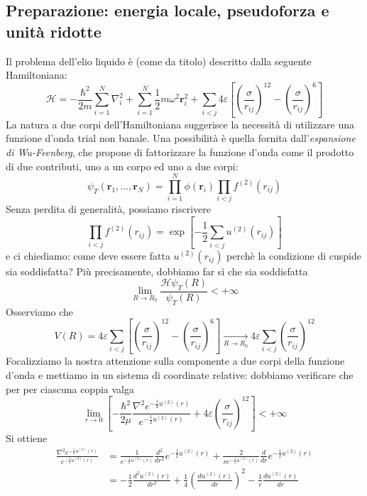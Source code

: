 \documentclass[11pt,a4paper]{article}
\begin{document}
\subsection{Preparazione: energia locale, pseudoforza e unità ridotte}
Il problema dell'elio liquido è (come da titolo) descritto dalla seguente Hamiltoniana:
\begin{equation}
\mathcal{H} = -\frac{\hbar^2}{2m}\sum_{i=1}^N \nabla_i^2 + \sum_{i=1}^N\frac{1}{2}m\omega^2\textbf{r}_i^2 + \sum_{i<j}4\varepsilon \left[ \left(\frac{\sigma}{r_{ij}}\right)^{12}- \left(\frac{\sigma}{r_{ij}}\right)^6 \right]
\end{equation}
La natura a due corpi dell'Hamiltoniana suggerisce la necessità di utilizzare una funzione d'onda trial non banale. Una possibilità è quella fornita dall'\emph{espansione di Wu-Feenberg}, che propone di fattorizzare la funzione d'onda come il prodotto di due contributi, uno a un corpo ed uno a due corpi:
\begin{equation}
\psi_T(\textbf{r}_1,\ldots,\textbf{r}_N) = \prod_{i=1}^N \phi(\textbf{r}_i)\prod_{i<j}f^{(2)}(r_{ij})
\end{equation}
Senza perdita di generalità, possiamo riscrivere
\[
\prod_{i<j}f^{(2)}(r_{ij}) = \exp\left[ -\frac{1}{2}\sum_{i<j}u^{(2)}(r_{ij})\right]
\]
e ci chiediamo: come deve essere fatta $u^{(2)}(r_{ij})$ perchè la condizione di cuspide sia soddisfatta? Più precisamente, dobbiamo far sì che sia soddisfatta
\begin{equation}
\lim_{R\to R_0}\frac{\mathcal{H}\psi_T(R)}{\psi_T(R)}< +\infty
\end{equation}
Osserviamo che
\[
V(R) = 4\varepsilon \sum_{i<j}\left[ \left(\frac{\sigma}{r_{ij}}\right)^{12}- \left(\frac{\sigma}{r_{ij}}\right)^6 \right] \xrightarrow[R \to R_0]{} 4\varepsilon \sum_{i<j}\left(\frac{\sigma}{r_{ij}}\right)^{12}
\]
Focalizziamo la nostra attenzione sulla componente a due corpi della funzione d'onda e mettiamo in un sistema di coordinate relative: dobbiamo verificare che per per ciascuna coppia valga
\[
\lim_{r \to 0} \left[ -\frac{\hbar^2}{2\mu}\frac{\nabla^2 e^{-\frac{1}{2}u^{(2)}(r)}}{e^{-\frac{1}{2}u^{(2)}(r)}} +  4\varepsilon\left(\frac{\sigma}{r_{ij}}\right)^{12}\right] < +\infty
\]
Si ottiene
\[
\begin{split}
\frac{\nabla^2 e^{-\frac{1}{2}u^{(2)}(r)}}{e^{-\frac{1}{2}u^{(2)}(r)}} &= \frac{1}{e^{-\frac{1}{2}u^{(2)}(r)}}\frac{d^2}{dr^2}e^{-\frac{1}{2}u^{(2)}(r)} + \frac{2}{re^{-\frac{1}{2}u^{(2)}(r)}}\frac{d}{dr}e^{-\frac{1}{2}u^{(2)}(r)} \\
&= -\frac{1}{2}\frac{d^2u^{(2)}(r)}{dr^2}+\frac{1}{4}\left( \frac{du^{(2)}(r)}{dr}\right)^2 - \frac{1}{r}\frac{du^{(2)}(r)}{dr}
\end{split}
\]
\end{document}
